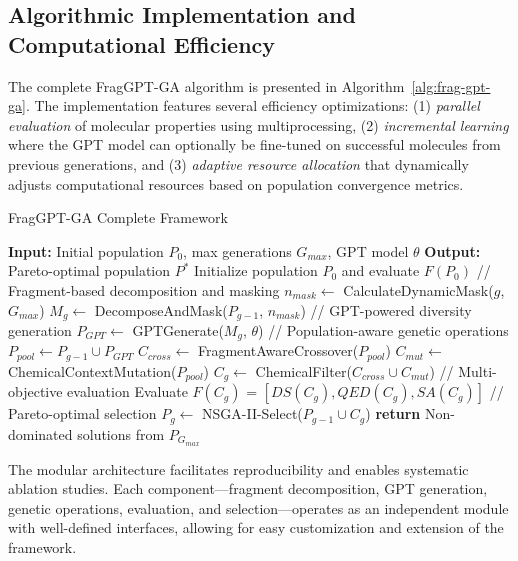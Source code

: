 \documentclass[lettersize,journal]{IEEEtran}
\begin{document}
\subsection{Algorithmic Implementation and Computational Efficiency}

The complete FragGPT-GA algorithm is presented in Algorithm~\ref{alg:frag-gpt-ga}. The implementation features several efficiency optimizations: (1) \textit{parallel evaluation} of molecular properties using multiprocessing, (2) \textit{incremental learning} where the GPT model can optionally be fine-tuned on successful molecules from previous generations, and (3) \textit{adaptive resource allocation} that dynamically adjusts computational resources based on population convergence metrics.

\begin{algorithm}[!t]
\caption{FragGPT-GA Complete Framework}
\label{alg:frag-gpt-ga}
\begin{algorithmic}
\STATE \textbf{Input:} Initial population $P_0$, max generations $G_{max}$, GPT model $\theta$
\STATE \textbf{Output:} Pareto-optimal population $P^*$
\STATE Initialize population $P_0$ and evaluate $F(P_0)$
    \STATE // Fragment-based decomposition and masking
    \STATE $n_{mask} \leftarrow$ CalculateDynamicMask($g$, $G_{max}$)
    \STATE $M_g \leftarrow$ DecomposeAndMask($P_{g-1}$, $n_{mask}$)
    \STATE // GPT-powered diversity generation
    \STATE $P_{GPT} \leftarrow$ GPTGenerate($M_g$, $\theta$)
    \STATE // Population-aware genetic operations
    \STATE $P_{pool} \leftarrow P_{g-1} \cup P_{GPT}$
    \STATE $C_{cross} \leftarrow$ FragmentAwareCrossover($P_{pool}$)
    \STATE $C_{mut} \leftarrow$ ChemicalContextMutation($P_{pool}$)
    \STATE $C_g \leftarrow$ ChemicalFilter($C_{cross} \cup C_{mut}$)
    \STATE // Multi-objective evaluation
    \STATE Evaluate $F(C_g)$ = $[DS(C_g), QED(C_g), SA(C_g)]$
    \STATE // Pareto-optimal selection
    \STATE $P_g \leftarrow$ NSGA-II-Select($P_{g-1} \cup C_g$)
\ENDFOR
\STATE \textbf{return} Non-dominated solutions from $P_{G_{max}}$
\end{algorithmic}
\end{algorithm}

The modular architecture facilitates reproducibility and enables systematic ablation studies. Each component—fragment decomposition, GPT generation, genetic operations, evaluation, and selection—operates as an independent module with well-defined interfaces, allowing for easy customization and extension of the framework.
\end{document}

